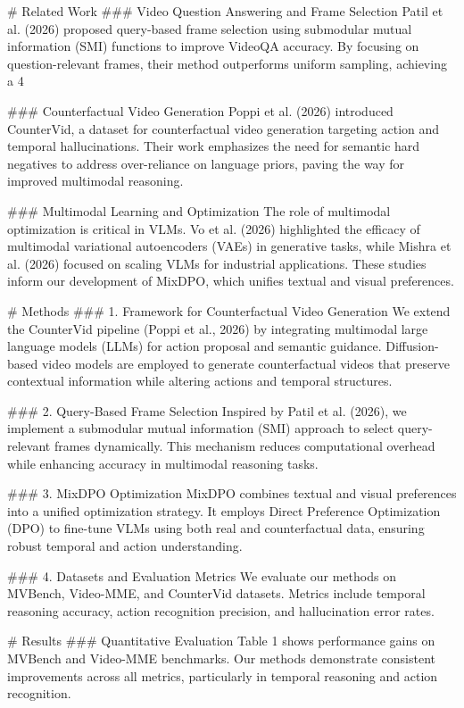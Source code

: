 # Related Work  
### Video Question Answering and Frame Selection  
Patil et al. (2026) proposed query-based frame selection using submodular mutual information (SMI) functions to improve VideoQA accuracy. By focusing on question-relevant frames, their method outperforms uniform sampling, achieving a 4%

### Counterfactual Video Generation  
Poppi et al. (2026) introduced CounterVid, a dataset for counterfactual video generation targeting action and temporal hallucinations. Their work emphasizes the need for semantic hard negatives to address over-reliance on language priors, paving the way for improved multimodal reasoning.

### Multimodal Learning and Optimization  
The role of multimodal optimization is critical in VLMs. Vo et al. (2026) highlighted the efficacy of multimodal variational autoencoders (VAEs) in generative tasks, while Mishra et al. (2026) focused on scaling VLMs for industrial applications. These studies inform our development of MixDPO, which unifies textual and visual preferences.

# Methods  
### 1. Framework for Counterfactual Video Generation  
We extend the CounterVid pipeline (Poppi et al., 2026) by integrating multimodal large language models (LLMs) for action proposal and semantic guidance. Diffusion-based video models are employed to generate counterfactual videos that preserve contextual information while altering actions and temporal structures.  

### 2. Query-Based Frame Selection  
Inspired by Patil et al. (2026), we implement a submodular mutual information (SMI) approach to select query-relevant frames dynamically. This mechanism reduces computational overhead while enhancing accuracy in multimodal reasoning tasks.

### 3. MixDPO Optimization  
MixDPO combines textual and visual preferences into a unified optimization strategy. It employs Direct Preference Optimization (DPO) to fine-tune VLMs using both real and counterfactual data, ensuring robust temporal and action understanding.

### 4. Datasets and Evaluation Metrics  
We evaluate our methods on MVBench, Video-MME, and CounterVid datasets. Metrics include temporal reasoning accuracy, action recognition precision, and hallucination error rates.

# Results  
### Quantitative Evaluation  
Table 1 shows performance gains on MVBench and Video-MME benchmarks. Our methods demonstrate consistent improvements across all metrics, particularly in temporal reasoning and action recognition.

